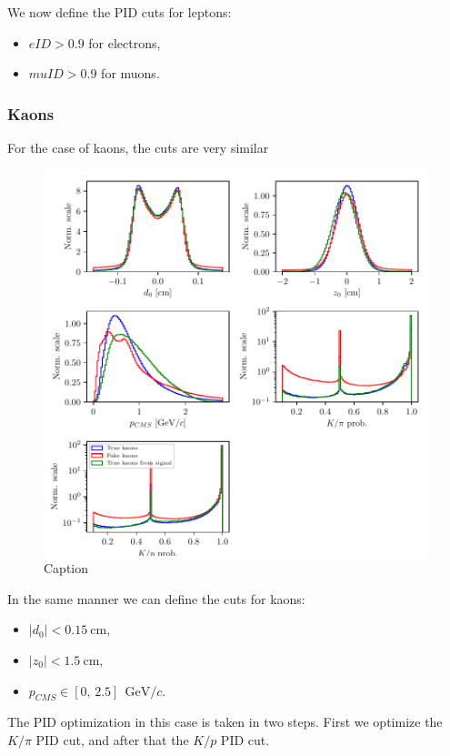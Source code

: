 \documentclass[oneside,a4paper,openany,12pt]{scrbook}
\newcommand {\e}[1]{\mathrm{~#1}}
\begin{document}
We now define the PID cuts for leptons:
\begin{itemize}
\item $eID > 0.9$ for electrons,
\item $muID > 0.9$ for muons.
\end{itemize}

\subsubsection{Kaons}

For the case of kaons, the cuts are very similar

\begin{figure}[!h]
\centering
\includegraphics[scale=1]{fig/FSP_kaon_vars}
\caption{Caption}
\end{figure}

In the same manner we can define the cuts for kaons:
\begin{itemize}
\item $\vert d_0 \vert < 0.15\e{cm}$,
\item $\vert z_0 \vert < 1.5\e{cm}$,
\item $p_{CMS} \in [0,\,2.5]~\e{GeV}/c$.
\end{itemize}

The PID optimization in this case is taken in two steps. First we optimize the $K / \pi$ PID cut, and after that the $K/p$ PID cut.
\end{document}

